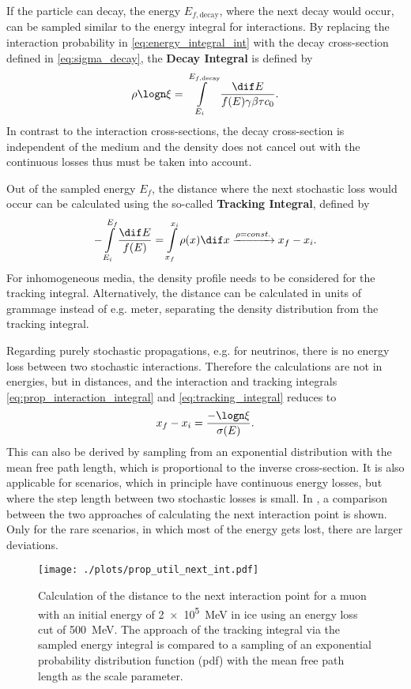 If the particle can decay, the energy $E_{f,\text{decay}}$, where the next decay would occur, can be sampled similar to the energy integral for interactions.
By replacing the interaction probability in \eqref{eq:energy_integral_int} with the decay cross-section defined in \eqref{eq:sigma_decay}, the \textbf{Decay Integral} is defined by
\begin{align}
    \rho \logn \xi = \int\limits_{E_i}^{E_{f,\text{decay}}} \frac{\dif E}{f(E) \gamma\beta \tau c_0} .
\end{align}
In contrast to the interaction cross-sections, the decay cross-section is independent of the medium and the density does not cancel out with the continuous losses thus must be taken into account.

Out of the sampled energy $E_f$, the distance where the next stochastic loss would occur can be calculated using the so-called \textbf{Tracking Integral}, defined by
\begin{align} \label{eq:tracking_integral}
    - \int\limits_{E_i}^{E_f} \frac{\dif E}{f(E)}
    = \int\limits_{x_f}^{x_i} \rho(x) \dif x
    \xrightarrow{\rho=const.}
    x_f - x_i .
\end{align}
For inhomogeneous media, the density profile needs to be considered for the tracking integral.
Alternatively, the distance can be calculated in units of grammage instead of e.g. meter, separating the density distribution from the tracking integral.

Regarding purely stochastic propagations, e.g. for neutrinos, there is no energy loss between two stochastic interactions.
Therefore the calculations are not in energies, but in distances, and the interaction and tracking integrals \eqref{eq:prop_interaction_integral} and \eqref{eq:tracking_integral} reduces to
\begin{align} \label{eq:tracking_stochastic}
    x_f - x_i = \frac{- \logn \xi}{\sigma(E)} .
\end{align}
This can also be derived by sampling from an exponential distribution with the mean free path length, which is proportional to the inverse cross-section.
It is also applicable for scenarios, which in principle have continuous energy losses, but where the step length between two stochastic losses is small.
In , a comparison between the two approaches of calculating the next interaction point is shown.
Only for the rare scenarios, in which most of the energy gets lost, there are larger deviations.
\begin{figure}
    \centering
    \texttt{[image: ./plots/prop\_util\_next\_int.pdf]}
    \caption{Calculation of the distance to the next interaction point for a muon with an initial energy of \SI{2e5}{MeV} in ice using an energy loss cut of \SI{500}{MeV}. The approach of the tracking integral via the sampled energy integral is compared to a sampling of an exponential probability distribution function (pdf) with the mean free path length as the scale parameter.}
    \label{fig:prop_util_tracking}
\end{figure}


